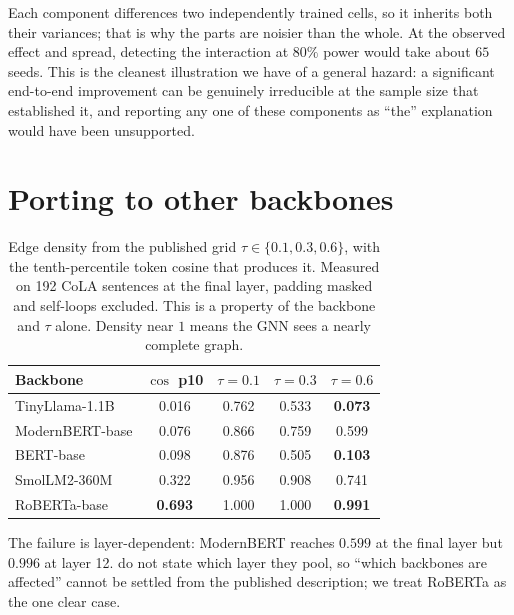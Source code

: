 \documentclass{article}
\begin{document}
Each component differences two independently trained cells, so it inherits both
their variances; that is why the parts are noisier than the whole. At the
observed effect and spread, detecting the interaction at $80\%$ power would take
about $65$ seeds. This is the cleanest illustration we have of a general
hazard: a significant end-to-end improvement can be genuinely irreducible at the
sample size that established it, and reporting any one of these components as
``the'' explanation would have been unsupported.

\section{Porting to other backbones}
\label{app:calib}

\begin{table}[h]
\caption{Edge density from the published grid $\tau \in \{0.1,0.3,0.6\}$, with
the tenth-percentile token cosine that produces it. Measured on 192 CoLA
sentences at the final layer, padding masked and self-loops excluded. This is a
property of the backbone and $\tau$ alone. Density near $1$ means the GNN sees a
nearly complete graph.}
\label{tab:density}
\begin{center}
\small
\begin{tabular}{lcccc}
\toprule
Backbone & $\cos$ p10 & $\tau{=}0.1$ & $\tau{=}0.3$ & $\tau{=}0.6$ \\
\midrule
TinyLlama-1.1B   & 0.016 & 0.762 & 0.533 & \textbf{0.073} \\
ModernBERT-base  & 0.076 & 0.866 & 0.759 & 0.599 \\
BERT-base        & 0.098 & 0.876 & 0.505 & \textbf{0.103} \\
SmolLM2-360M     & 0.322 & 0.956 & 0.908 & 0.741 \\
RoBERTa-base     & \textbf{0.693} & 1.000 & 1.000 & \textbf{0.991} \\
\bottomrule
\end{tabular}
\end{center}
\end{table}

The failure is layer-dependent: ModernBERT reaches $0.599$ at the final layer
but $0.996$ at layer 12. \citet{mantri2026glot} do not state which layer they
pool, so ``which backbones are affected'' cannot be settled from the published
description; we treat RoBERTa as the one clear case.
\end{document}
